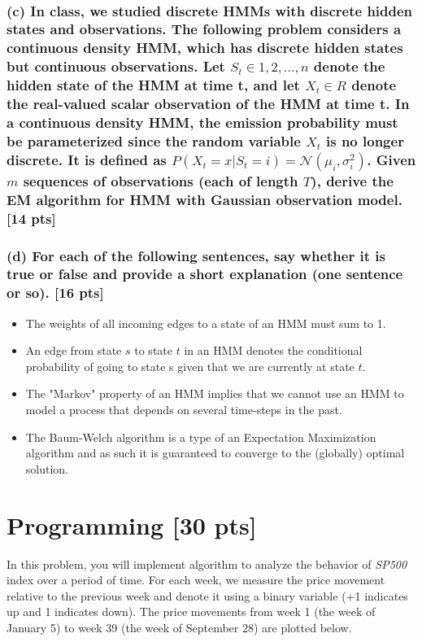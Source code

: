 \documentclass[twoside,11pt]{article}\usepackage{amsmath,amsfonts,amsthm,fullpage}
\begin{document}
~\\
\fi

\subsubsection*{(c) In class, we studied discrete HMMs with discrete hidden states and
observations. The following problem considers a continuous density
HMM, which has discrete hidden states but continuous observations.
Let $S_t \in {1, 2, ..., n}$ denote the hidden state of the HMM at
time t, and let $X_t \in R$ denote the real-valued scalar
observation of the HMM at time t. In a continuous density HMM, the
emission probability must be parameterized since the random variable
$X_t$ is no longer discrete. It is defined as $P(X_t = x|S_t = i) =
\mathcal{N}(\mu_i,\sigma_i^2)$. Given $m$ sequences of observations
(each of length $T$), derive the EM algorithm for HMM with Gaussian
observation model. [14 pts]}


\subsubsection*{(d) For each of the following sentences, say whether it is true or false and provide a short explanation (one
sentence or so). [16 pts]}

\begin{itemize}
  \item The weights of all incoming edges to a state of an HMM must sum to 1.
  \item An edge from state $s$ to state $t$ in an HMM denotes the conditional probability of going to state s given that we are currently at state $t$.
  \item The "Markov" property of an HMM implies that we cannot use an HMM to model a process that depends on several time-steps in the past.
  \item The Baum-Welch algorithm is a type of an Expectation Maximization algorithm and as such it is guaranteed to converge to the (globally) optimal solution.
\end{itemize}


\section{Programming [30 pts]}

In this problem, you will implement  algorithm to analyze the
behavior of \emph{SP500} index over a period of time. For each week,
we measure the price movement relative to the previous week and
denote it using a binary variable (+1 indicates up and 1 indicates
down). The price movements from week 1 (the week of January 5) to
week 39 (the week of September 28) are plotted below.
\end{document}
